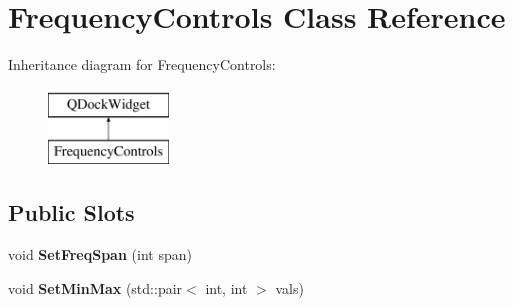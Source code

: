 \hypertarget{class_frequency_controls}{}\section{Frequency\+Controls Class Reference}
\label{class_frequency_controls}
Inheritance diagram for Frequency\+Controls\+:\begin{figure}[H]
\begin{center}
\leavevmode
\includegraphics[height=2.000000cm]{class_frequency_controls}
\end{center}
\end{figure}
\subsection*{Public Slots}
\begin{DoxyCompactItemize}
\item 
void {\bfseries Set\+Freq\+Span} (int span)\hypertarget{class_frequency_controls_a88109da989b014a69677728e96bb6a8a}{}\label{class_frequency_controls_a88109da989b014a69677728e96bb6a8a}

\item 
void {\bfseries Set\+Min\+Max} (std\+::pair$<$ int, int $>$ vals)\hypertarget{class_frequency_controls_acf2eee8710eac492be4004217fbbafd1}{}\label{class_frequency_controls_acf2eee8710eac492be4004217fbbafd1}

\end{DoxyCompactItemize}
